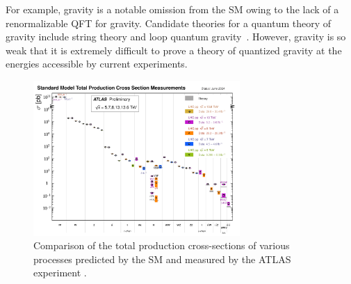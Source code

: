 For example, gravity is a notable omission from the SM owing to the lack of a renormalizable QFT for gravity.
Candidate theories for a quantum theory of gravity include string theory and loop quantum gravity~\cite{GravityQFT}.
However, gravity is so weak that it is extremely difficult to prove a theory of quantized gravity at the energies accessible by current experiments.

\begin{figure}
    \centering
    \includegraphics[width=0.7\textwidth]{Figures/standard_model/sm_summary.pdf}
    \caption{Comparison of the total production cross-sections of various processes predicted by the SM and measured by the ATLAS experiment \cite{ATLAS:2024cgh}.}
    \label{fig:sm_precision}
\end{figure}


